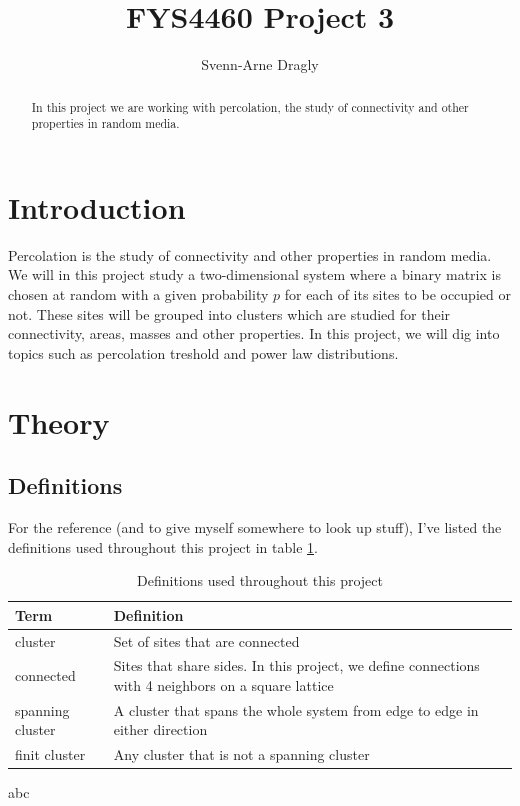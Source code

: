 \documentclass[a4paper,reprint,floatfix,amsmath,amssymb,aps,pra]{revtex4-1}
\begin{document}
\title{FYS4460 Project 3}
\author{Svenn-Arne Dragly}

\begin{abstract}
In this project we are working with percolation, the study of connectivity and other properties in random media.
\end{abstract}

\maketitle

\section{Introduction}

Percolation is the study of connectivity and other properties in random media. We will in this project study a two-dimensional system where a binary matrix is chosen at random with a given probability $p$ for each of its sites to be occupied or not. These sites will be grouped into clusters which are studied for their connectivity, areas, masses and other properties. In this project, we will dig into topics such as percolation treshold and power law distributions.

\section{Theory}

\subsection{Definitions}

For the reference (and to give myself somewhere to look up stuff), I've listed the definitions used throughout this project in table \ref{tab:definitions}.
\begingroup
\begin{table}[ht]
\setlength\extrarowheight{4pt} %
\begin{ruledtabular}
\begin{tabular}{l p{}}
Term       &                  Definition \\
\hline
cluster & Set of sites that are connected \\
connected & Sites that share sides. In this project, we define connections with 4 neighbors on a square lattice \\
spanning cluster & A cluster that spans the whole system from edge to edge in either direction \\
finit cluster & Any cluster that is not a spanning cluster \\
\end{tabular}
\end{ruledtabular}
\caption{Definitions used throughout this project}
\label{tab:definitions}
\end{table}
\endgroup
\begin{table}
abc
\end{table}
\end{document}
